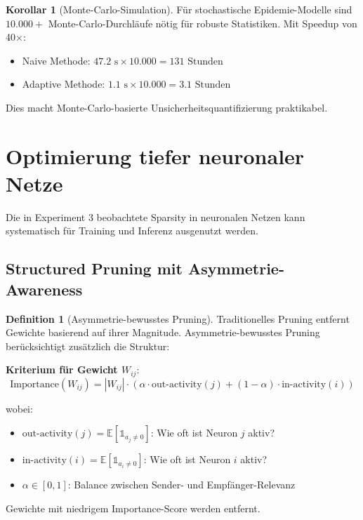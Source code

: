 \documentclass[a4paper,12pt]{report}
\theoremstyle{definition}
\newtheorem{definition}{Definition}
\newtheorem{korollar}{Korollar}
\begin{document}
	\begin{korollar}[Monte-Carlo-Simulation]
		Für stochastische Epidemie-Modelle sind $10.000+$ Monte-Carlo-Durchläufe nötig für robuste Statistiken. Mit Speedup von 40$\times$:
		\begin{itemize}
			\item Naive Methode: $47.2 \text{ s} \times 10.000 = 131 \text{ Stunden}$
			\item Adaptive Methode: $1.1 \text{ s} \times 10.000 = 3.1 \text{ Stunden}$
		\end{itemize}
		
		Dies macht Monte-Carlo-basierte Unsicherheitsquantifizierung praktikabel.
	\end{korollar}
	
	\section{Optimierung tiefer neuronaler Netze}
	
	Die in Experiment 3 beobachtete Sparsity in neuronalen Netzen kann systematisch für Training und Inferenz ausgenutzt werden.
	
	\subsection{Structured Pruning mit Asymmetrie-Awareness}
	
	\begin{definition}[Asymmetrie-bewusstes Pruning]
		Traditionelles Pruning entfernt Gewichte basierend auf ihrer Magnitude. Asymmetrie-bewusstes Pruning berücksichtigt zusätzlich die Struktur:
		
		\textbf{Kriterium für Gewicht $W_{ij}$}:
		\[
		\text{Importance}(W_{ij}) = |W_{ij}| \cdot \left( \alpha \cdot \text{out-activity}(j) + (1-\alpha) \cdot \text{in-activity}(i) \right)
		\]
		
		wobei:
		\begin{itemize}
			\item $\text{out-activity}(j) = \mathbb{E}[\mathbb{1}_{a_j \neq 0}]$: Wie oft ist Neuron $j$ aktiv?
			\item $\text{in-activity}(i) = \mathbb{E}[\mathbb{1}_{a_i \neq 0}]$: Wie oft ist Neuron $i$ aktiv?
			\item $\alpha \in [0,1]$: Balance zwischen Sender- und Empfänger-Relevanz
		\end{itemize}
		
		Gewichte mit niedrigem Importance-Score werden entfernt.
	\end{definition}
	
\end{document}

